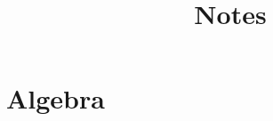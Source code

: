 \documentclass[letterpaper,11pt]{report}
\begin{document}
\makeatletter
\newtheorem*{rep@theorem}{\rep@title}
\newcommand{\newreptheorem}[2]{%
\newenvironment{rep#1}[1]{%
 \def\rep@title{#2 \ref{##1}}%
 \begin{rep@theorem}}%
 {\end{rep@theorem}}}
\makeatother

\newtheorem{thm}{Theorem}
\newreptheorem{thm}{Theorem}
\newtheorem{prop}{Proposition}
\newtheorem{cor}{Corollary}
\newtheorem{lem}{Lemma}
\newreptheorem{lem}{Lemma}

\theoremstyle{definition}
\newtheorem{defn}{Definition}
\newtheorem{conj}{Conjecture}
\newtheorem{prob}{Problem}

\theoremstyle{remark}
\newtheorem{rem}{Remark}
\newtheorem{ex}{Example}
\newtheorem{exer}{Exercise}

\newcommand{\Rho}{\mathrm{P}}
\newcommand{\cS}{\mathcal{S}}
\newcommand{\cM}{\mathcal{M}}
\newcommand{\cN}{\mathcal{N}}
\newcommand{\gk}{\kappa}
\newcommand{\gS}{\Sigma}
\newcommand{\gl}{\lambda}
\newcommand{\gt}{\theta}

\newcommand{\cF}{\mathcal{F}}
\newcommand{\cG}{\mathcal{G}}
\newcommand{\cP}{\mathcal{P}}
\newcommand{\cV}{\mathcal{V}}
\newcommand{\cB}{\mathcal{B}}
\newcommand{\cA}{\mathcal{A}}
\newcommand{\ZZ}{\mathbb{Z}}
\newcommand{\NN}{\mathbb{N}}
\newcommand{\bA}{\mathbb{A}}
\newcommand{\bB}{\mathbb{B}}
\newcommand{\bC}{\mathbb{C}}
\newcommand{\bD}{\mathbb{D}}
\newcommand{\bE}{\mathbb{E}}
\newcommand{\bF}{\mathbb{F}}
\newcommand{\bI}{\mathbb{I}}
\newcommand{\bP}{\mathbb{P}}
\newcommand{\bS}{\mathbb{S}}
\newcommand{\fA}{\mathbf{A}}
\newcommand{\fB}{\mathbf{B}}

\newcommand{\RR}{\mathbb{R}}
\newcommand{\CC}{\mathbb{C}}
\newcommand{\FF}{\mathbb{F}}
\newcommand{\HH}{\mathbb{H}}
\newcommand{\PP}{\mathbb{P}}
\newcommand{\EE}{\mathbb{E}}

\newcommand{\cK}{\mathcal{K}}
\newcommand{\cL}{\mathcal{L}}
\newcommand{\cO}{\mathcal{O}}

\newcommand{\fp}{\mathfrak{p}}

\newcommand{\dotcup}{\ensuremath{\mathaccent\cdot\cup}}

\title{Notes}
\date{}
\author{}
\maketitle

\tableofcontents


\chapter{Algebra}
\end{document}
